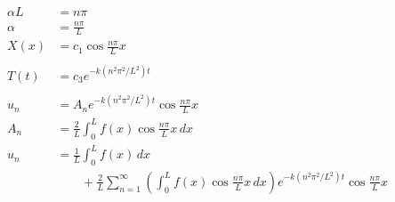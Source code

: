 \documentclass{article}
\begin{document}
\begin{align*}
  \alpha L                                             & = n \pi                                                                                                                                              \\
  \alpha                                               & = \frac{n \pi}{L}                                                                                                                                    \\
  X(x)                                                 & = c_1 \cos \frac{n \pi}{L} x                                                                                                                         \\ \\
  T(t)                                                 & = c_3 e^{-k (n^2 \pi^2 / L^2) t}                                                                                                                     \\ \\
  u_n                                                  & = A_n e^{-k (n^2 \pi^2 / L^2) t} \cos \frac{n \pi}{L} x                                                                                              \\
  A_n                                                  & = \frac{2}{L} \int_0^L f(x) \cos \frac{n \pi}{L} x \,d x                                                                                             \\
  u_n                                                  & = \frac{1}{L} \int_0^L f(x) \,d x                                                                                                                    \\
                                                       & \qquad + \frac{2}{L} \sum_{n = 1}^\infty \left( \int_0^L f(x) \cos \frac{n \pi}{L} x \,d x \right) e^{-k (n^2 \pi^2 / L^2) t} \cos \frac{n \pi}{L} x
\end{align*}

\setcounter{subsubsection}{4}
\subsubsection{}
\end{document}
